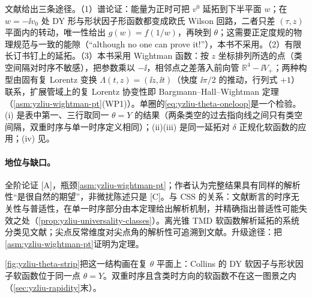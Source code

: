 \begin{proofsketch}
文献\cite[第~4.5--4.7~节，附录~F、H]{Liu:2022nnk}给出三条途径。（1）谱论证：能量为正时可把 $v^0$ 延拓到下半平面 $w$；在 $w=-\ii v_0$ 处 DY 形与形状因子形函数都变成欧氏 Wilson 回路，二者只差 $(\tau,z)$ 平面内的转动，唯一性给出 $g(w)=f(1/w)$，再映到 $\theta$\cite[式~(124)--(134)]{Liu:2022nnk}；这需要正定度规的物理规范与一致的能隙（“although no one can prove it!”），本书不采用。（2）有限长订书钉上的延拓。（3）本书采用 Wightman 函数：按 $z$ 坐标排列所选的点（类空间隔对时序不敏感），把参数乘以 $-\ii$，相邻点之差落入前向管 $\mathbb R^4-\ii V_+$；两种构型由固有复 Lorentz 变换 $\Lambda(t,z)=(\ii z,\ii t)$（快度 $\ii\pi/2$ 的推动，行列式 $+1$）联系，扩展管域上的复 Lorentz 协变性即 Bargmann--Hall--Wightman 定理（\cref{asm:yzliu-wightman-pt}(WP1)）。单圈的\cref{eq:yzliu-theta-oneloop}是一个检验。(i) 是表中第一、三行取同一 $\theta=Y$ 的结果（两条类空的过去指向线之间只有类空间隔，双重时序与单一时序定义相同）；(ii)(iii) 是同一延拓对 $\delta$ 正规化软函数的应用；(iv) 见\cite[式~(H.7)--(H.11)]{Liu:2022nnk}。
\end{proofsketch}

\paragraph{地位与缺口。}全阶论证 [A]，瓶颈\cref{asm:yzliu-wightman-pt}；作者认为完整结果具有同样的解析性“是很自然的期望”，非微扰陈述只是 [C]。与 CSS 的关系：文献\cite{Collins2011,CollinsMetz2004}断言的时序无关性与普适性，在单一时序部分由本定理给出解析机制，并精确指出普适性可能失效之处（\cref{prop:yzliu-universality-classes}）。离光锥 TMD 软函数解析延拓的系统分类见文献\cite{Liu:2022nnk}；尖点反常维度对尖点角的解析性可追溯到文献\cite{KorchemskyRadyushkin1987}。升级途径：把\cref{asm:yzliu-wightman-pt}证明为定理。


\cref{fig:yzliu-theta-strip}把这一结构画在复 $\theta$ 平面上：Collins 的 DY 软因子与形状因子软函数位于同一点 $\theta=Y$。双重时序且含类时方向的软函数不在这一图景之内（\cref{sec:yzliu-rapidity}末）。
